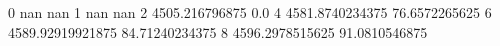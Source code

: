 0 nan nan
1 nan nan
2 4505.216796875 0.0
4 4581.8740234375 76.6572265625
6 4589.92919921875 84.71240234375
8 4596.2978515625 91.0810546875
